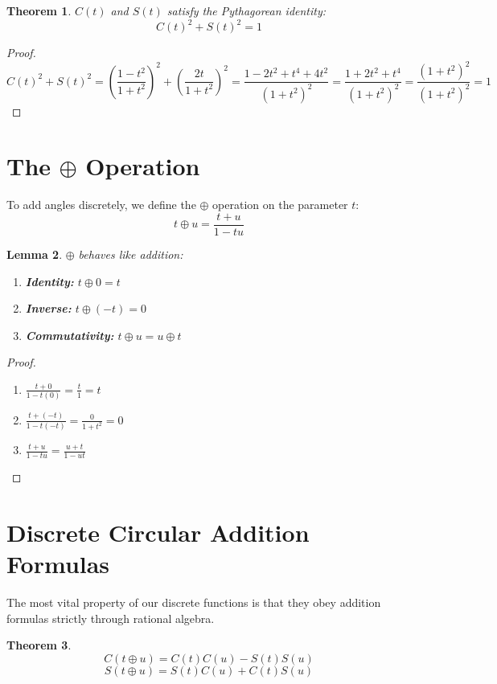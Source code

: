 \documentclass[12pt]{article}
\newtheorem{theorem}{Theorem}
\newtheorem{lemma}[theorem]{Lemma}
\begin{document}
\begin{theorem}
$C(t)$ and $S(t)$ satisfy the Pythagorean identity:
\[ C(t)^2 + S(t)^2 = 1 \]
\end{theorem}

\begin{proof}
\[ C(t)^2 + S(t)^2 = \left(\frac{1-t^2}{1+t^2}\right)^2 + \left(\frac{2t}{1+t^2}\right)^2 = \frac{1 - 2t^2 + t^4 + 4t^2}{(1+t^2)^2} = \frac{1 + 2t^2 + t^4}{(1+t^2)^2} = \frac{(1+t^2)^2}{(1+t^2)^2} = 1 \]
\end{proof}

\section{The $\oplus$ Operation}

To add angles discretely, we define the $\oplus$ operation on the parameter $t$:
\[ t \oplus u = \frac{t+u}{1-tu} \]

\begin{lemma}
$\oplus$ behaves like addition:
\begin{enumerate}
    \item \textbf{Identity:} $t \oplus 0 = t$
    \item \textbf{Inverse:} $t \oplus (-t) = 0$
    \item \textbf{Commutativity:} $t \oplus u = u \oplus t$
\end{enumerate}
\end{lemma}

\begin{proof}
\begin{enumerate}
    \item $\frac{t+0}{1-t(0)} = \frac{t}{1} = t$
    \item $\frac{t+(-t)}{1-t(-t)} = \frac{0}{1+t^2} = 0$
    \item $\frac{t+u}{1-tu} = \frac{u+t}{1-ut}$ \qedhere
\end{enumerate}
\end{proof}

\section{Discrete Circular Addition Formulas}

The most vital property of our discrete functions is that they obey addition formulas strictly through rational algebra.

\begin{theorem}
\[ C(t \oplus u) = C(t)C(u) - S(t)S(u) \]
\[ S(t \oplus u) = S(t)C(u) + C(t)S(u) \]
\end{theorem}
\end{document}
